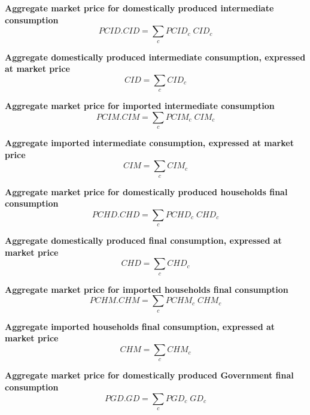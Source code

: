 \documentclass[12pt]{article}
\numberwithin{equation}{section}
\begin{document}
\noindent\textbf{Aggregate market price for domestically produced intermediate consumption} \\
\begin{dmath}
PCID . CID = \sum_{c} PCID_{c} \; CID_{c}
\end{dmath}

\noindent\textbf{Aggregate domestically produced intermediate consumption, expressed at market price} \\
\begin{dmath}
CID = \sum_{c} CID_{c}
\end{dmath}

\noindent\textbf{Aggregate market price for imported intermediate consumption} \\
\begin{dmath}
PCIM . CIM = \sum_{c} PCIM_{c} \; CIM_{c}
\end{dmath}

\noindent\textbf{ Aggregate imported intermediate consumption, expressed at market price} \\
\begin{dmath}
CIM = \sum_{c} CIM_{c}
\end{dmath}

\noindent\textbf{Aggregate market price for domestically produced households final consumption} \\
\begin{dmath}
PCHD . CHD = \sum_{c} PCHD_{c} \; CHD_{c}
\end{dmath}

\noindent\textbf{Aggregate domestically produced final consumption, expressed at market price} \\
\begin{dmath}
CHD = \sum_{c} CHD_{c}
\end{dmath}

\noindent\textbf{Aggregate market price for imported households final consumption} \\
\begin{dmath}
PCHM . CHM = \sum_{c} PCHM_{c} \; CHM_{c}
\end{dmath}

\noindent\textbf{Aggregate imported households final consumption, expressed at market price} \\
\begin{dmath}
CHM = \sum_{c} CHM_{c}
\end{dmath}

\noindent\textbf{Aggregate market price for domestically produced Government final consumption} \\
\begin{dmath}
PGD . GD = \sum_{c} PGD_{c} \; GD_{c}
\end{dmath}
\end{document}
